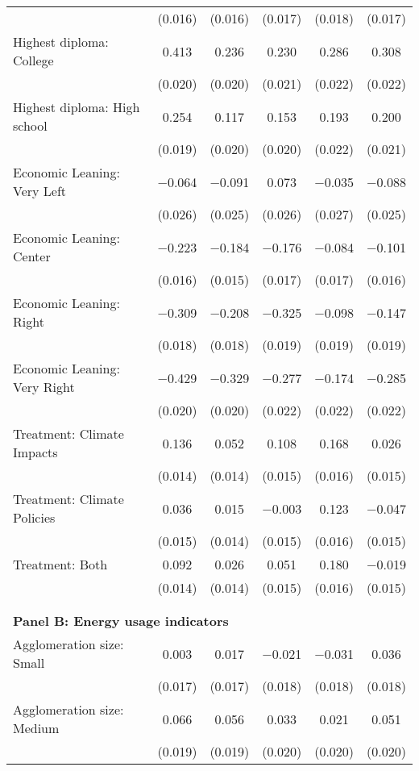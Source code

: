 \begin{tabular}{@{\extracolsep{5pt}}lccccc}
  & (0.016) & (0.016) & (0.017) & (0.018) & (0.017) \\ 
  Highest diploma: College & 0.413 & 0.236 & 0.230 & 0.286 & 0.308 \\ 
  & (0.020) & (0.020) & (0.021) & (0.022) & (0.022) \\ 
  Highest diploma: High school & 0.254 & 0.117 & 0.153 & 0.193 & 0.200 \\ 
  & (0.019) & (0.020) & (0.020) & (0.022) & (0.021) \\ 
  Economic Leaning: Very Left & $-$0.064 & $-$0.091 & 0.073 & $-$0.035 & $-$0.088 \\ 
  & (0.026) & (0.025) & (0.026) & (0.027) & (0.025) \\ 
  Economic Leaning: Center & $-$0.223 & $-$0.184 & $-$0.176 & $-$0.084 & $-$0.101 \\ 
  & (0.016) & (0.015) & (0.017) & (0.017) & (0.016) \\ 
  Economic Leaning: Right & $-$0.309 & $-$0.208 & $-$0.325 & $-$0.098 & $-$0.147 \\ 
  & (0.018) & (0.018) & (0.019) & (0.019) & (0.019) \\ 
  Economic Leaning: Very Right & $-$0.429 & $-$0.329 & $-$0.277 & $-$0.174 & $-$0.285 \\ 
  & (0.020) & (0.020) & (0.022) & (0.022) & (0.022) \\ 
  Treatment: Climate Impacts & 0.136 & 0.052 & 0.108 & 0.168 & 0.026 \\ 
  & (0.014) & (0.014) & (0.015) & (0.016) & (0.015) \\ 
  Treatment: Climate Policies & 0.036 & 0.015 & $-$0.003 & 0.123 & $-$0.047 \\ 
  & (0.015) & (0.014) & (0.015) & (0.016) & (0.015) \\ 
  Treatment: Both & 0.092 & 0.026 & 0.051 & 0.180 & $-$0.019 \\ 
  & (0.014) & (0.014) & (0.015) & (0.016) & (0.015) \\ 
 \\[1ex] \hline \\[1ex]
\multicolumn{ 6 }{l}{\textbf{ Panel B: Energy usage indicators }} \\
  Agglomeration size: Small & 0.003 & 0.017 & $-$0.021 & $-$0.031 & 0.036 \\ 
  & (0.017) & (0.017) & (0.018) & (0.018) & (0.018) \\ 
  Agglomeration size: Medium & 0.066 & 0.056 & 0.033 & 0.021 & 0.051 \\ 
  & (0.019) & (0.019) & (0.020) & (0.020) & (0.020) \\ 

\end{tabular}

